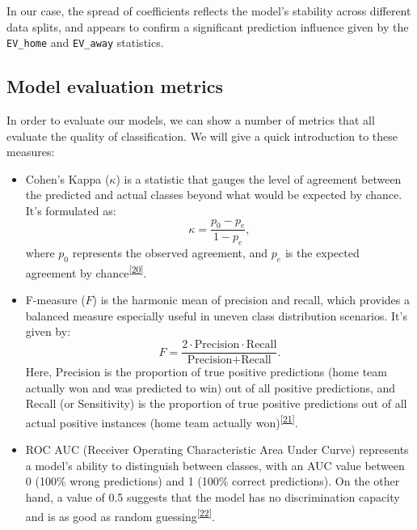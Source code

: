 \documentclass[
  12pt,
  a4paper,
]{article}
\begin{document}
In our case, the spread of coefficients reflects the model's stability across different data splits, and appears to confirm a significant prediction influence given by the \texttt{EV\_home} and \texttt{EV\_away} statistics.

\hypertarget{model-evaluation-metrics}{%
\subsection{Model evaluation metrics}\label{model-evaluation-metrics}}

In order to evaluate our models, we can show a number of metrics that all evaluate the quality of classification. We will give a quick introduction to these measures:

\begin{itemize}
\item
  Cohen's Kappa (\(\kappa\)) is a statistic that gauges the level of agreement between the predicted and actual classes beyond what would be expected by chance. It's formulated as: \[\kappa=\frac{p_0-p_e}{1-p_e},\] where \(p_0\) represents the observed agreement, and \(p_e\) is the expected agreement by chance\textsuperscript{{[}\protect\hyperlink{ref-cohenkappa}{20}{]}}.
\item
  F-measure (\(F\)) is the harmonic mean of precision and recall, which provides a balanced measure especially useful in uneven class distribution scenarios. It's given by: \[F=\frac{2\cdot\text{Precision}\cdot\text{Recall}}{\text{Precision}+\text{Recall}}.\] Here, Precision is the proportion of true positive predictions (home team actually won and was predicted to win) out of all positive predictions, and Recall (or Sensitivity) is the proportion of true positive predictions out of all actual positive instances (home team actually won)\textsuperscript{{[}\protect\hyperlink{ref-fmeas}{21}{]}}.
\item
  ROC AUC (Receiver Operating Characteristic Area Under Curve) represents a model's ability to distinguish between classes, with an AUC value between 0 (100\% wrong predictions) and 1 (100\% correct predictions). On the other hand, a value of 0.5 suggests that the model has no discrimination capacity and is as good as random guessing\textsuperscript{{[}\protect\hyperlink{ref-rocauc}{22}{]}}.
\end{itemize}
\end{document}
